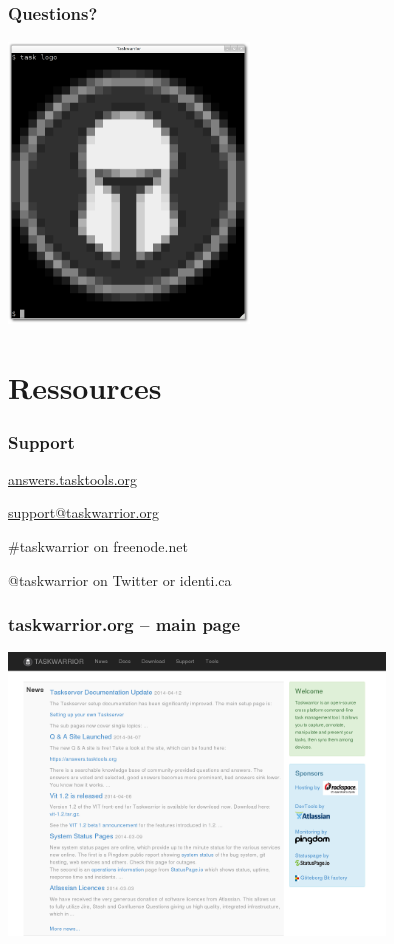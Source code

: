 \documentclass[t,handout]{beamer}
\begin{document}
\begin{frame}\frametitle{Questions?}
\begin{center}
\includegraphics[width=6.4cm,height=7.5cm]{task_logo.png}
\end{center}
\end{frame}

\section{Ressources} 

\begin{frame}\frametitle{Support}
\begin{center}
\href{https://answers.tasktools.org/}{answers.tasktools.org}

\href{mailto:support@taskwarrior.org}{support@taskwarrior.org}

\#taskwarrior on freenode.net

@taskwarrior on Twitter or identi.ca
\end{center}
\end{frame}

\begin{frame}\frametitle{taskwarrior.org -- main page}
\begin{center}
\href{http://taskwarrior.org}{\includegraphics[width=10cm,height=7.5cm]{taskwarrior-org.png}}
\end{center}
\end{frame}
\end{document}
